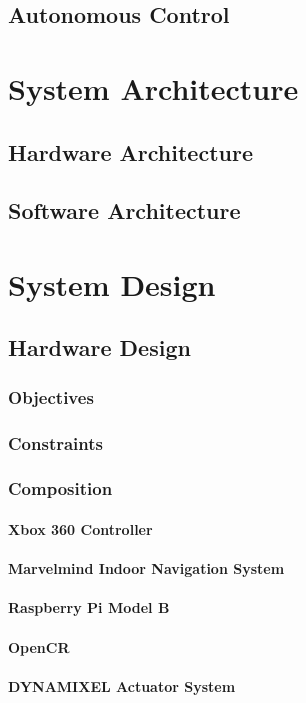 \documentclass[english,12pt]{article}
\begin{document}
\subsection{Autonomous Control}
\section{System Architecture}
\subsection{Hardware Architecture}
\subsection{Software Architecture}
\section{System Design}
\subsection{Hardware Design}
\subsubsection{Objectives}
\subsubsection{Constraints}
\subsubsection{Composition}
\paragraph{Xbox 360 Controller}
\paragraph{Marvelmind Indoor Navigation System}
\paragraph{Raspberry Pi Model B}
\paragraph{OpenCR}
\paragraph{DYNAMIXEL Actuator System}
\end{document}
